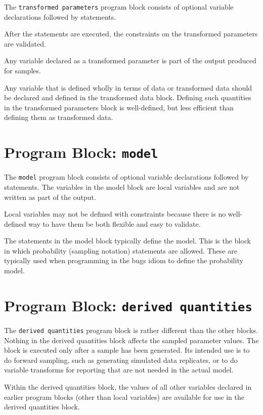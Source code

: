 \documentclass[10pt]{report}
\newcommand{\acronym}[1]{{\sc #1}\xspace}
\newcommand{\BUGS}{\acronym{bugs}}
\newcommand{\code}[1]{{\tt #1}}
\begin{document}
The \code{transformed parameters} program block consists of optional
variable declarations followed by statements.  

After the statements are executed, the constraints on the 
transformed parameters are validated. 

Any variable declared as a transformed parameter is part of the output
produced for samples.

Any variable that is defined wholly in terms of data or transformed
data should be declared and defined in the transformed data block.
Defining such quantities in the transformed parameters block is
well-defined, but less efficient than defining them as transformed
data.

\section{Program Block: \code{model}}

The \code{model} program block consists of optional variable
declarations followed by statements.  The variables in the model block
are local variables and are not written as part of the output.  

Local variables may not be defined with constraints because there is
no well-defined way to have them be both flexible and easy to
validate.

The statements in the model block typically define the model.  This is
the block in which probability (sampling notation) statements are
allowed.  These are typically used when programming in the \BUGS idiom
to define the probability model.  


\section{Program Block: \code{derived quantities}}

The \code{derived quantities} program block is rather different than
the other blocks.  Nothing in the derived quantities block affects the
sampled parameter values.  The block is executed only after a sample
has been generated.  Its intended use is to do forward sampling, such
as generating simulated data replicates, or to do variable transforms
for reporting that are not needed in the actual model.

Within the derived quantities block, the values of all other variables
declared in earlier program blocks (other than local variables) are
available for use in the derived quantities block.
\end{document}
